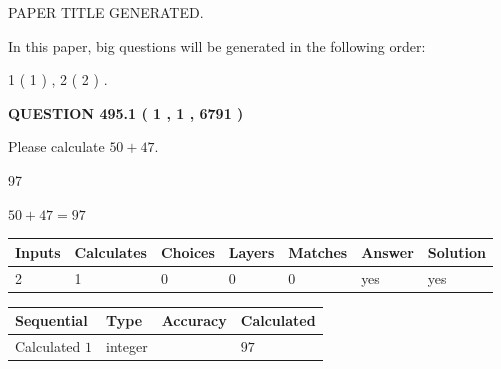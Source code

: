 \documentclass[12pt]{article}
\begin{document}
 
 
 
   
   
 PAPER TITLE GENERATED.
   
   
   
\vspace{0.2in}
   
In this paper, big questions will be generated in the following order: 
   
   
   1 ( 1 )
 ,
   2 ( 2 )
 .
  
\vspace{0.2in}
  
{\textbf{\Large{QUESTION
495.1 
 ( 1 , 1 , 6791 )
}}}
  
  
 
Please calculate $ %
50 +  %
47 $.
 
 
 
\noindent{}
 
 

97
 
 
\noindent{}
 
 

 
 
 
\noindent{}
 
 

$ %
50 +  %
47=   %
97$
 
 
\noindent{}
 
 

 
   
   
   
   
\noindent\begin{tabular}{|l|l|l|l|l|l|l|}
 \hline
Inputs & Calculates & Choices & Layers & Matches & Answer & Solution \\ \hline
 2  & 
 1  & 
 0
  & 
 0  & 
 0  & 
  yes & 
  yes 
  \\ \hline
 \end{tabular}
   
   
   
   
\noindent{}
   
   
  
  
\noindent\begin{tabular}{|l|l|l|l|}
\hline
 Sequential & Type & Accuracy & Calculated \\ 
\hline
 
 
  Calculated $  1 $ & integer &  & 
  $ 97 $ 
 \\  \hline  
 \end{tabular}
   
\end{document}
